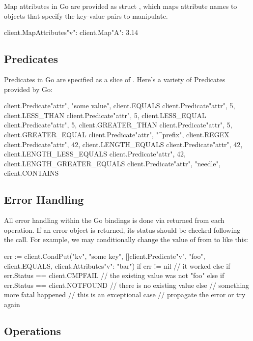 Map attributes in Go are provided as struct , which
maps attribute names to  objects that specify the key-value
pairs to manipulate.

\begin{gocode}
client.MapAttributes{"v": client.Map{"A": 3.14}}
\end{gocode}

\subsection{Predicates}
\label{sec:api:go-client:predicates}

Predicates in Go are specified as a slice of .  Here's a
variety of Predicates provided by Go:

\begin{gocode}
client.Predicate{"attr", "some value", client.EQUALS}
client.Predicate{"attr", 5, client.LESS_THAN}
client.Predicate{"attr", 5, client.LESS_EQUAL}
client.Predicate{"attr", 5, client.GREATER_THAN}
client.Predicate{"attr", 5, client.GREATER_EQUAL}
client.Predicate{"attr", "^prefix", client.REGEX}
client.Predicate{"attr", 42, client.LENGTH_EQUALS}
client.Predicate{"attr", 42, client.LENGTH_LESS_EQUALS}
client.Predicate{"attr", 42, client.LENGTH_GREATER_EQUALS}
client.Predicate{"attr", "needle", client.CONTAINS}
\end{gocode}

\subsection{Error Handling}
\label{sec:api:go-client:error-handling}

All error handling within the Go bindings is done via 
returned from each operation.  If an error object is returned, its
status should be checked following the call.  For example, we may conditionally
change the value of  from  to  like this:

\begin{gocode}
err := client.CondPut("kv", "some key",
        []client.Predicate{{"v", "foo", client.EQUALS}},
        client.Attributes{"v": "bar"})
if err != nil {
    // it worked
} else if err.Status == client.CMPFAIL {
    // the existing value was not "foo"
} else if err.Status == client.NOTFOUND {
    // there is no existing value
} else {
    // something more fatal happened
    // this is an exceptional case
    // propagate the error or try again
}
\end{gocode}

\subsection{Operations}
\label{sec:api:go-client:ops}


